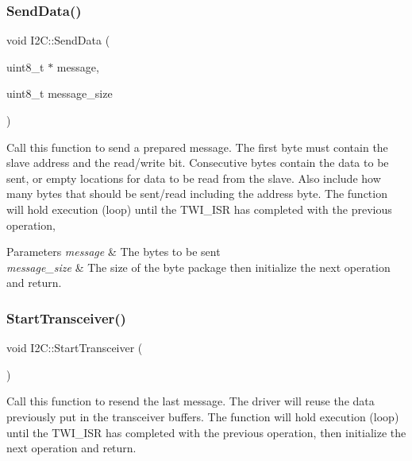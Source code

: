 \subsubsection{\texorpdfstring{Send\+Data()}{SendData()}}
{\footnotesize\ttfamily void I2\+C\+::\+Send\+Data (\begin{DoxyParamCaption}\item[{uint8\+\_\+t $\ast$}]{message,  }\item[{uint8\+\_\+t}]{message\+\_\+size }\end{DoxyParamCaption})}

Call this function to send a prepared message. The first byte must contain the slave address and the read/write bit. Consecutive bytes contain the data to be sent, or empty locations for data to be read from the slave. Also include how many bytes that should be sent/read including the address byte. The function will hold execution (loop) until the T\+W\+I\+\_\+\+I\+SR has completed with the previous operation, 
\begin{DoxyParams}{Parameters}
{\em message} & The bytes to be sent \\
\hline
{\em message\+\_\+size} & The size of the byte package then initialize the next operation and return. \\
\hline
\end{DoxyParams}
\hypertarget{class_i2_c_af8c970cb20a2b5bdcf80ef35c662658f}{}\label{class_i2_c_af8c970cb20a2b5bdcf80ef35c662658f} 
\subsubsection{\texorpdfstring{Start\+Transceiver()}{StartTransceiver()}}
{\footnotesize\ttfamily void I2\+C\+::\+Start\+Transceiver (\begin{DoxyParamCaption}{ }\end{DoxyParamCaption})}

Call this function to resend the last message. The driver will reuse the data previously put in the transceiver buffers. The function will hold execution (loop) until the T\+W\+I\+\_\+\+I\+SR has completed with the previous operation, then initialize the next operation and return. \hypertarget{class_i2_c_a3e6747576e7d4abf506296f8675ec3b5}{}\label{class_i2_c_a3e6747576e7d4abf506296f8675ec3b5} 
